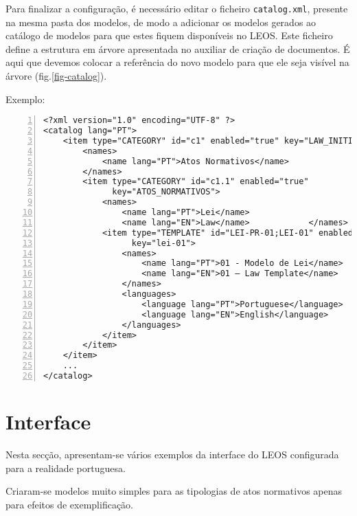 Para finalizar a configuração, é necessário editar o ficheiro \texttt{catalog.xml}, 
presente na mesma pasta dos modelos, de modo a adicionar os modelos gerados ao catálogo de modelos 
para que estes fiquem disponíveis no LEOS. 
Este ficheiro define a estrutura em árvore apresentada no auxiliar de criação de documentos. 
É aqui que devemos colocar a referência do novo modelo para que ele seja visível na árvore (fig.\ref{fig-catalog}).

  
Exemplo:
 
\begin{Verbatim}[frame=single, numbers=left, fontsize=\scriptsize, commandchars=\\\{\}]
<?xml version="1.0" encoding="UTF-8" ?>
<catalog lang="PT">
    <item type="CATEGORY" id="c1" enabled="true" key="LAW_INITIATIVE">
        <names>
            <name lang="PT">Atos Normativos</name>
        </names>
        <item type="CATEGORY" id="c1.1" enabled="true" 
              key="ATOS_NORMATIVOS">
            <names>
                <name lang="PT">Lei</name>
                <name lang="EN">Law</name>            </names>
            <item type="TEMPLATE" id="LEI-PR-01;LEI-01" enabled="true" 
                  key="lei-01">
                <names>
                    <name lang="PT">01 - Modelo de Lei</name>
                    <name lang="EN">01 – Law Template</name>
                </names>
                <languages>
                    <language lang="PT">Portuguese</language>
                    <language lang="EN">English</language>
                </languages>
            </item>
        </item>
    </item>
    ... 
</catalog>
\end{Verbatim} 


\section{Interface}

Nesta secção, apresentam-se vários exemplos da interface do LEOS configurada para a realidade portuguesa.

Criaram-se modelos muito simples para as tipologias de atos normativos apenas para efeitos de exemplificação.
 

